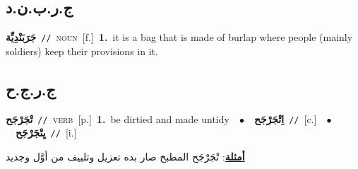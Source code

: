 \documentclass[10pt,a4paper,twoside]{article} %
\begin{document}
\begin{multicols}{2}
\vspace{-3mm}
\subsection*{\color{blue}\foreignlanguage{arabic}{ج.ر.ب.ن.د}\color{blue}{ (ntws)}} 

{\setlength\topsep{0pt}\textbf{\foreignlanguage{arabic}{جَرَبَنْدِيِّة}}\ {\color{gray}\texttt{//}\color{black}}\ \textsc{noun}\ [f.]\ \textbf{1.}~it is a bag that is made of burlap where people (mainly soldiers) keep their provisions in it.\ } \vspace{2mm}

\vspace{-3mm}
\subsection*{\color{blue}\foreignlanguage{arabic}{ج.ر.ج.ح}\color{blue}{}} 

{\setlength\topsep{0pt}\textbf{\foreignlanguage{arabic}{تْجَرْجَح}}\ {\color{gray}\texttt{//}\color{black}}\ \textsc{verb}\ [p.]\ \textbf{1.}~be dirtied and made untidy\ \ $\bullet$\ \ \setlength\topsep{0pt}\textbf{\foreignlanguage{arabic}{اِتْجَرْجَح}}\ {\color{gray}\texttt{//}\color{black}}\ [c.]\ \ $\bullet$\ \ \setlength\topsep{0pt}\textbf{\foreignlanguage{arabic}{يِتْجَرْجَح}}\ {\color{gray}\texttt{//}\color{black}}\ [i.]\  \begin{flushright}\color{gray}\foreignlanguage{arabic}{\textbf{\underline{\foreignlanguage{arabic}{أمثلة}}}: تْجَرْجَح المطبخ صار بده تعزيل وتلييف من أوَّل وجديد}\end{flushright}\color{black}} \vspace{2mm}


\end{multicols}
\end{document}
